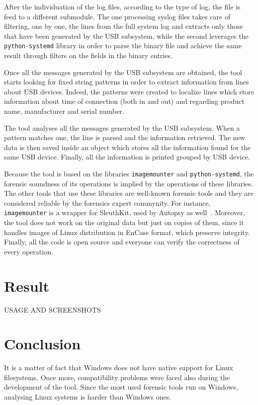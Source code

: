 \documentclass[a4paper]{article}
\begin{document}
After the individuation of the log files, according to the type of log, the
file is feed to a different submodule. The one processing syslog files takes
care of filtering, one by one, the lines from the full system log and extracts
only those that have been generated by the USB subsystem, while the second
leverages the \texttt{python-systemd} library in order to parse the binary file
and achieve the same result through filters on the fields in the binary
entries.

Once all the messages generated by the USB subsystem are obtained, the tool
starts looking for fixed string patterns in order to extract information from
lines about USB devices. Indeed, the patterns were created to localize lines
which store information about time of connection (both in and out) and
regarding product name, manufacturer and serial number.

The tool analyses all the messages generated by the USB subsystem. When a
pattern matches one, the line is parsed and the information retrieved. The new
data is then saved inside an object which stores all the information found for
the same USB device. Finally, all the information is printed grouped by USB
device.

Because the tool is based on the libraries \texttt{imagemounter} and
\texttt{python-systemd}, the forensic soundness of its operations is implied by
the operations of these libraries. The other tools that use these libraries are
well-known forensic tools and they are considered reliable by the forensics
expert commynity. For instance, \texttt{imagemounter} is a wrapper for
SleuthKit, used by Autopsy as well~\cite{sleuthkit}. Moreover, the tool does not
work on the original data but just on copies of them, since it handles images of
Linux distribution in EnCase format, which preserve integrity. Finally, all the
code is open source and everyone can verify the correctness of every operation.

\section{Result}
\label{sec:result}

USAGE AND SCREENSHOTS

\section{Conclusion}
\label{sec:concl}
It is a matter of fact that Windows does not have native support for Linux
filesystems. Once more, compatibility problems were faced also during the
development of the tool. Since the most used forensic tools run on Windows,
analysing Linux systems is harder than Windows ones.
\end{document}
